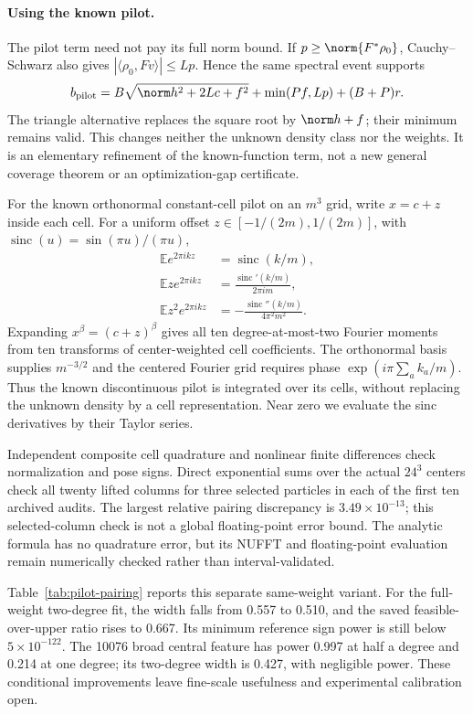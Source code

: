 \paragraph{Using the known pilot.}
The pilot term need not pay its full norm bound. If
$p\ge\norm{F^*\rho_0}$, Cauchy--Schwarz also gives
$|\langle\rho_0,Fv\rangle|\le Lp$. Hence the same spectral event supports
\begin{equation}
 b_{\rm pilot}=B\sqrt{\norm h^2+2Lc+f^2}
       +\min(Pf,Lp)+(B+P)r.
 \label{eq:pilot-cross-bias}
\end{equation}
The triangle alternative replaces the square root by $\norm h+f$;
their minimum remains valid. This changes neither the unknown density class
nor the weights. It is an elementary refinement of the known-function term,
not a new general coverage theorem or an optimization-gap certificate.

For the known orthonormal constant-cell pilot on an $m^3$ grid, write
$x=c+z$ inside each cell. For a uniform offset
$z\in[-1/(2m),1/(2m)]$, with $\operatorname{sinc}(u)=\sin(\pi u)/(\pi u)$,
\begin{align*}
 \mathbb E e^{2\pi i k z}&=\operatorname{sinc}(k/m),\\
 \mathbb E z e^{2\pi i k z}&=\frac{\operatorname{sinc}'(k/m)}{2\pi i m},\\
 \mathbb E z^2 e^{2\pi i k z}&=-\frac{\operatorname{sinc}''(k/m)}{4\pi^2m^2}.
\end{align*}
Expanding $x^\beta=(c+z)^\beta$ gives all ten degree-at-most-two
Fourier moments from ten transforms of center-weighted cell coefficients.
The orthonormal basis supplies $m^{-3/2}$ and the centered Fourier grid
requires phase $\exp(i\pi\sum_a k_a/m)$. Thus the known discontinuous
pilot is integrated over its cells, without replacing the unknown density
by a cell representation. Near zero we evaluate the sinc derivatives by
their Taylor series.

Independent composite cell quadrature and nonlinear finite differences
check normalization and pose signs. Direct exponential sums over the actual
$24^3$ centers check all twenty lifted columns for three selected particles
in each of the first ten archived audits. The largest relative pairing
discrepancy is $3.49\times10^{-13}$; this selected-column check is not a
global floating-point error bound. The analytic formula has no quadrature
error, but its NUFFT and floating-point evaluation remain numerically
checked rather than interval-validated.

Table~\ref{tab:pilot-pairing} reports this separate same-weight variant.
For the full-weight two-degree fit, the width falls from 0.557 to 0.510,
and the saved feasible-over-upper ratio rises to 0.667. Its minimum
reference sign power is still below $5\times10^{-122}$. The 10076 broad
central feature has power 0.997 at half a degree and 0.214 at one degree;
its two-degree width is 0.427, with negligible power. These conditional
improvements leave fine-scale usefulness and experimental calibration open.


